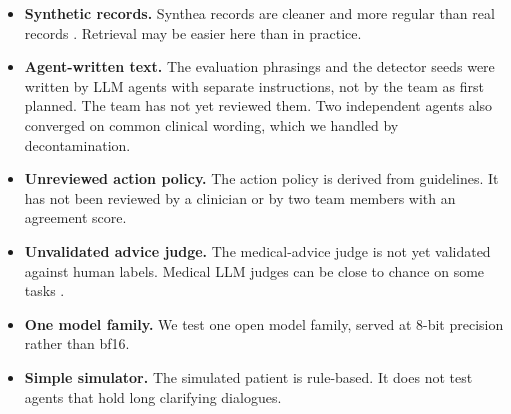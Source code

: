 \begin{itemize}
\item \textbf{Synthetic records.} Synthea records are cleaner and more regular than real records \citep{chen2019synthea}. Retrieval may be easier here than in practice.
\item \textbf{Agent-written text.} The evaluation phrasings and the detector seeds were written by LLM agents with separate instructions, not by the team as first planned. The team has not yet reviewed them. Two independent agents also converged on common clinical wording, which we handled by decontamination.
\item \textbf{Unreviewed action policy.} The action policy is derived from guidelines. It has not been reviewed by a clinician or by two team members with an agreement score.
\item \textbf{Unvalidated advice judge.} The medical-advice judge is not yet validated against human labels. Medical LLM judges can be close to chance on some tasks \citep{delucia2026verdict}.
\item \textbf{One model family.} We test one open model family, served at 8-bit precision rather than bf16.
\item \textbf{Simple simulator.} The simulated patient is rule-based. It does not test agents that hold long clarifying dialogues.
\end{itemize}
